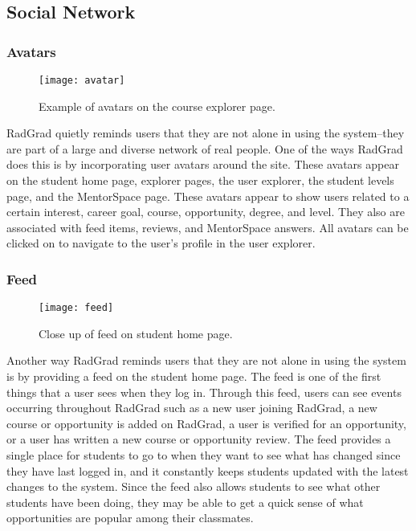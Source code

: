 \subsection{Social Network}
\subsubsection{Avatars}
\begin{figure}[htbp!]
\centering
\texttt{[image: avatar]}
\caption{Example of avatars on the course explorer page.}
\end{figure}
RadGrad quietly reminds users that they are not alone in using the system--they are part of a large and diverse network of real people. One of the ways RadGrad does this is by incorporating user avatars around the site. These avatars appear on the student home page, explorer pages, the user explorer, the student levels page, and the MentorSpace page. These avatars appear to show users related to a certain interest, career goal, course, opportunity, degree, and level. They also are associated with feed items, reviews, and MentorSpace answers. All avatars can be clicked on to navigate to the user's profile in the user explorer.  

\subsubsection{Feed}
\begin{figure}[htbp!]
\centering
\texttt{[image: feed]}
\caption{Close up of feed on student home page.}
\end{figure}
Another way RadGrad reminds users that they are not alone in using the system is by providing a feed on the student home page. The feed is one of the first things that a user sees when they log in. Through this feed, users can see events occurring throughout RadGrad such as a new user joining RadGrad, a new course or opportunity is added on RadGrad, a user is verified for an opportunity, or a user has written a new course or opportunity review. The feed provides a single place for students to go to when they want to see what has changed since they have last logged in, and it constantly keeps students updated with the latest changes to the system. Since the feed also allows students to see what other students have been doing, they may be able to get a quick sense of what opportunities are popular among their classmates.

